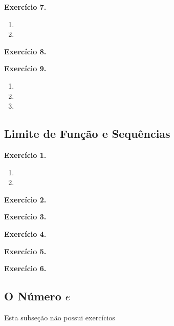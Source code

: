 \documentclass[12pt,a4paper]{article}
\begin{document}
\vspace{0.5cm}
\noindent\textbf{Exercício 7.}
\begin{enumerate}
    \renewcommand{\theenumi}{\alph{enumi}}
    \renewcommand{\labelenumi}{\theenumi)}
    \item 
    \item 
\end{enumerate}

\vspace{0.5cm}
\noindent\textbf{Exercício 8.}

\vspace{0.5cm}
\noindent\textbf{Exercício 9.}
\begin{enumerate}
    \renewcommand{\theenumi}{\alph{enumi}}
    \renewcommand{\labelenumi}{\theenumi)}
    \item 
    \item 
    \item 
\end{enumerate}

\subsection{Limite de Função e Sequências}
\vspace{0.5cm}
\noindent\textbf{Exercício 1.}
\begin{enumerate}
    \renewcommand{\theenumi}{\alph{enumi}}
    \renewcommand{\labelenumi}{\theenumi)}
    \item 
    \item 
\end{enumerate}

\vspace{0.5cm}
\noindent\textbf{Exercício 2.}

\vspace{0.5cm}
\noindent\textbf{Exercício 3.}

\vspace{0.5cm}
\noindent\textbf{Exercício 4.}

\vspace{0.5cm}
\noindent\textbf{Exercício 5.}

\vspace{0.5cm}
\noindent\textbf{Exercício 6.}

\subsection{O Número $e$}
Esta subseção não possui exercícios
\end{document}
